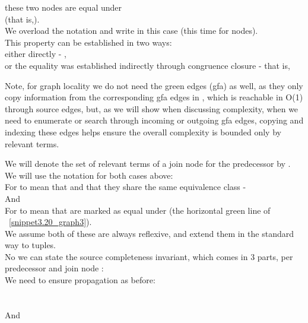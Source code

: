 these two nodes are equal under  \\
(that is,).\\
We overload the notation and write  in this case (this time for  nodes).\\
This property can be established in two ways:\\
either directly - , \\
or the equality was established indirectly through congruence closure - that is, \\

Note, for graph locality we do not need the green edges (gfa) as well, as they only copy information from the corresponding gfa edges in , which is reachable in O(1) through source edges, but, as we will show when discussing complexity, when we need to enumerate or search through incoming or outgoing gfa edges, copying and indexing these edges helps ensure the overall complexity is bounded only by relevant terms.

We will denote the set of relevant terms of a join node  for the predecessor  by .\\
We will use the notation  for both cases above:\\
For  to mean that  and that they share the same  equivalence class -\\
And\\
For  to mean that  are marked as equal under  (the horizontal green line of ~\ref{snippet3.20_graph3}).\\
We assume both of these are always reflexive, and extend them in the standard way to tuples.\\
No we can state the source completeness invariant, which comes in 3 parts, per predecessor  and join node :\\
We need to ensure propagation as before:\\
\\
\\
And\\

